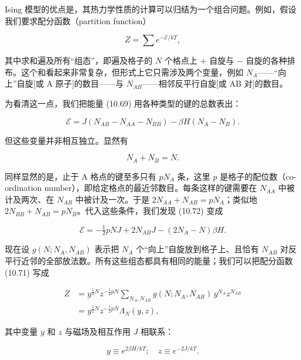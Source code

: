 Ising 模型的优点是，其热力学性质的计算可以归结为一个组合问题。例如，假设我们要求配分函数（partition function）

\begin{equation*}
Z = \sum e^{-\mathcal{E}/kT},
\tag{10.71}
\end{equation*}

其中求和遍及所有“组态”，即遍及格子的 $N$ 个格点上 $+$ 自旋与 $-$ 自旋的各种排布。这个和看起来非常复杂，但形式上它只需涉及两个变量，例如 $N_A$——“向上”自旋[或 A 原子]的数目——与 $N_{AB}$——相邻反平行自旋[或 AB 对]的数目。

为看清这一点，我们把能量 (10.69) 用各种类型的键的总数表出：

\begin{equation*}
\mathcal{E} = J(N_{AB} - N_{AA} - N_{BB}) - \beta H (N_A - N_B).
\tag{10.72}
\end{equation*}

但这些变量并非相互独立。显然有

\begin{equation*}
N_A + N_B = N.
\end{equation*}

同样显然的是，止于 A 格点的键至多只有 $pN_A$ 条，这里 $p$ 是格子的配位数（co-ordination number），即给定格点的最近邻数目。每条这样的键需要在 $N_{AA}$ 中被计及两次、在 $N_{AB}$ 中被计及一次。于是 $2N_{AA} + N_{AB} = pN_A$；类似地 $2N_{BB} + N_{AB} = pN_B$。代入这些条件，我们发现 (10.72) 变成

\begin{equation*}
\mathcal{E} = -\tfrac{1}{2} pNJ + 2N_{AB} J - (2N_A - N)\beta H.
\tag{10.73}
\end{equation*}

现在设 $g(N; N_A, N_{AB})$ 表示把 $N_A$ 个“向上”自旋放到格子上、且恰有 $N_{AB}$ 对反平行近邻的全部放法数。所有这些组态都具有相同的能量；我们可以把配分函数 (10.71) 写成

\begin{align*}
Z &= y^{\frac{1}{2}N} z^{-\frac{1}{2}pN} \sum_{N_A, N_{AB}} g(N; N_A, N_{AB})\, y^{N_A} z^{N_{AB}} \\
&= y^{\frac{1}{2}N} z^{-\frac{1}{2}pN} \Lambda_N(y, z),
\tag{10.74}
\end{align*}

其中变量 $y$ 和 $z$ 与磁场及相互作用 $J$ 相联系：

\begin{equation*}
y \equiv e^{2\beta H/kT}; \quad z \equiv e^{-2J/kT}.
\tag{10.75}
\end{equation*}

